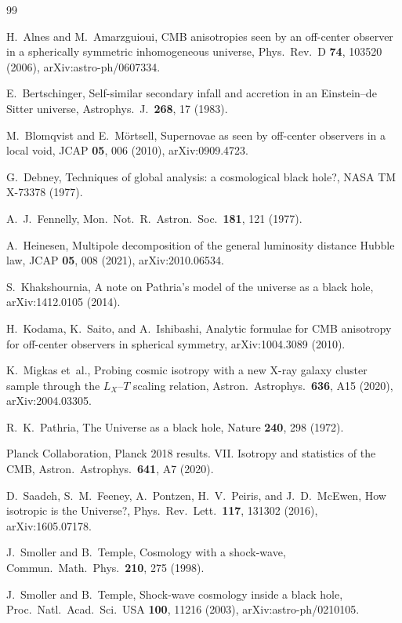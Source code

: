 \documentclass[11pt,a4paper]{article}
\begin{document}
\begin{thebibliography}{99}

H.~Alnes and M.~Amarzguioui,
CMB anisotropies seen by an off-center observer in a spherically symmetric
inhomogeneous universe,
Phys.\ Rev.\ D \textbf{74}, 103520 (2006), arXiv:astro-ph/0607334.

E.~Bertschinger,
Self-similar secondary infall and accretion in an Einstein--de Sitter universe,
Astrophys.\ J.\ \textbf{268}, 17 (1983).

M.~Blomqvist and E.~M{\"o}rtsell,
Supernovae as seen by off-center observers in a local void,
JCAP \textbf{05}, 006 (2010), arXiv:0909.4723.

G.~Debney,
Techniques of global analysis: a cosmological black hole?,
NASA TM X-73378 (1977).

A.~J.~Fennelly,
Mon.\ Not.\ R.\ Astron.\ Soc.\ \textbf{181}, 121 (1977).

A.~Heinesen,
Multipole decomposition of the general luminosity distance Hubble law,
JCAP \textbf{05}, 008 (2021), arXiv:2010.06534.

S.~Khakshournia,
A note on Pathria's model of the universe as a black hole,
arXiv:1412.0105 (2014).

H.~Kodama, K.~Saito, and A.~Ishibashi,
Analytic formulae for CMB anisotropy for off-center observers in spherical
symmetry, arXiv:1004.3089 (2010).

K.~Migkas et~al.,
Probing cosmic isotropy with a new X-ray galaxy cluster sample through the
$L_X$--$T$ scaling relation,
Astron.\ Astrophys.\ \textbf{636}, A15 (2020), arXiv:2004.03305.

R.~K.~Pathria,
The Universe as a black hole,
Nature \textbf{240}, 298 (1972).

Planck Collaboration,
Planck 2018 results. VII. Isotropy and statistics of the CMB,
Astron.\ Astrophys.\ \textbf{641}, A7 (2020).

D.~Saadeh, S.~M.~Feeney, A.~Pontzen, H.~V.~Peiris, and J.~D.~McEwen,
How isotropic is the Universe?,
Phys.\ Rev.\ Lett.\ \textbf{117}, 131302 (2016), arXiv:1605.07178.

J.~Smoller and B.~Temple,
Cosmology with a shock-wave,
Commun.\ Math.\ Phys.\ \textbf{210}, 275 (1998).

J.~Smoller and B.~Temple,
Shock-wave cosmology inside a black hole,
Proc.\ Natl.\ Acad.\ Sci.\ USA \textbf{100}, 11216 (2003), arXiv:astro-ph/0210105.

\end{thebibliography}
\end{document}
